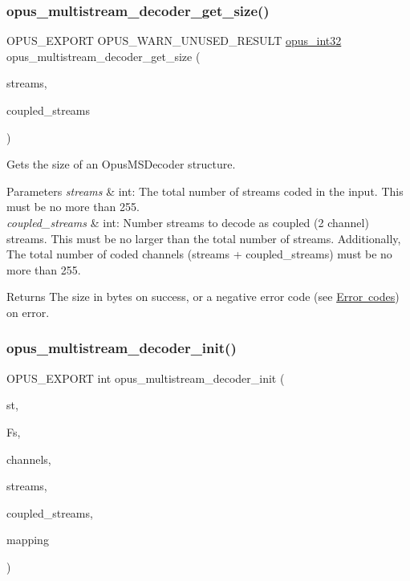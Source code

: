 \subsubsection{\texorpdfstring{opus\_multistream\_decoder\_get\_size()}{opus\_multistream\_decoder\_get\_size()}}
{\footnotesize\ttfamily O\+P\+U\+S\+\_\+\+E\+X\+P\+O\+RT O\+P\+U\+S\+\_\+\+W\+A\+R\+N\+\_\+\+U\+N\+U\+S\+E\+D\+\_\+\+R\+E\+S\+U\+LT \mbox{\hyperlink{opus__types_8h_aa4d309d6f80b99dbabebc8f98879ab9a}{opus\+\_\+int32}} opus\+\_\+multistream\+\_\+decoder\+\_\+get\+\_\+size (\begin{DoxyParamCaption}\item[{int}]{streams,  }\item[{int}]{coupled\+\_\+streams }\end{DoxyParamCaption})}

Gets the size of an {\ttfamily Opus\+M\+S\+Decoder} structure. 
\begin{DoxyParams}{Parameters}
{\em streams} & {\ttfamily int}\+: The total number of streams coded in the input. This must be no more than 255. \\
\hline
{\em coupled\+\_\+streams} & {\ttfamily int}\+: Number streams to decode as coupled (2 channel) streams. This must be no larger than the total number of streams. Additionally, The total number of coded channels ({\ttfamily streams + coupled\+\_\+streams}) must be no more than 255. \\
\hline
\end{DoxyParams}
\begin{DoxyReturn}{Returns}
The size in bytes on success, or a negative error code (see \mbox{\hyperlink{group__opus__errorcodes}{Error codes}}) on error. 
\end{DoxyReturn}
\mbox{\label{group__opus__multistream_gac9680d4205a5ea95785e747f0d2e393b}} 
\subsubsection{\texorpdfstring{opus\_multistream\_decoder\_init()}{opus\_multistream\_decoder\_init()}}
{\footnotesize\ttfamily O\+P\+U\+S\+\_\+\+E\+X\+P\+O\+RT int opus\+\_\+multistream\+\_\+decoder\+\_\+init (\begin{DoxyParamCaption}\item[{\mbox{\hyperlink{group__opus__multistream_gad3497495deb9a8ace82e76cd4f93e0e4}{Opus\+M\+S\+Decoder}} $\ast$}]{st,  }\item[{\mbox{\hyperlink{opus__types_8h_aa4d309d6f80b99dbabebc8f98879ab9a}{opus\+\_\+int32}}}]{Fs,  }\item[{int}]{channels,  }\item[{int}]{streams,  }\item[{int}]{coupled\+\_\+streams,  }\item[{const unsigned char $\ast$}]{mapping }\end{DoxyParamCaption})}

